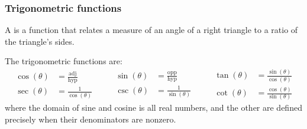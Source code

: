 \documentclass[10pt,t,presentation,ignorenonframetext,aspectratio=169]{beamer}
\begin{document}
\begin{frame}
  \frametitle{Trigonometric functions}

  A  is a function that relates a measure
  of an angle of a right triangle to a ratio of the triangle's sides.

  \vfill
  \begin{image}[2in]
  \end{image}
  \vfill
\end{frame}

\begin{frame}
  \vs
  \begin{definition}
    The trigonometric functions are:
    \[
      \begin{aligned}
        \cos(\theta) &= \frac{\text{adj}}{\text{hyp}}\\
        \sec(\theta) &= \frac{1}{\cos(\theta)}
      \end{aligned}
      \qquad
      \begin{aligned}
        \sin(\theta) &= \frac{\text{opp}}{\text{hyp}}\\
        \csc(\theta) &= \frac{1}{\sin(\theta)}
      \end{aligned}
      \qquad
      \begin{aligned}
        \tan(\theta) &= \frac{\sin(\theta)}{\cos(\theta)} \\
        \cot(\theta) &= \frac{\cos(\theta)}{\sin(\theta)}
      \end{aligned}
    \]
    where the domain of sine and cosine is all real numbers, and the
    other are defined precisely when their
    denominators are nonzero.
  \end{definition}
\end{frame}
\end{document}
